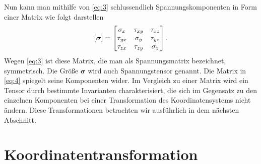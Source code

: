 \documentclass{lecture}
\begin{document}
    Nun kann man mithilfe von \eqref{eq:3} schlussendlich Spannungskomponenten in Form einer Matrix wie folgt darstellen
    \begin{equation}\label{eq:4}
        \brackets*{\bm{\sigma}} = \begin{bmatrix}
            \sigma_x & \tau_{xy} & \tau_{xz}\\
            \tau_{yx} & \sigma_y & \tau_{yz}\\
            \tau_{zx} & \tau_{zy} & \sigma_z
        \end{bmatrix}.
    \end{equation}
    Wegen \eqref{eq:3} ist diese Matrix, die man als Spannungsmatrix bezeichnet, symmetrisch.
    Die Größe \(\bm{\sigma}\) wird auch Spannungstensor genannt.
    Die Matrix in \eqref{eq:4} spiegelt seine Komponenten wider.
    Im Vergleich zu einer Matrix wird ein Tensor durch bestimmte Invarianten charakterisiert, die sich im Gegensatz zu den einzelnen Komponenten bei einer Transformation des Koordinatensystems nicht ändern.
    Diese Transformationen betrachten wir ausführlich in dem nächsten Abschnitt.


    \section*{Koordinatentransformation}
\end{document}
